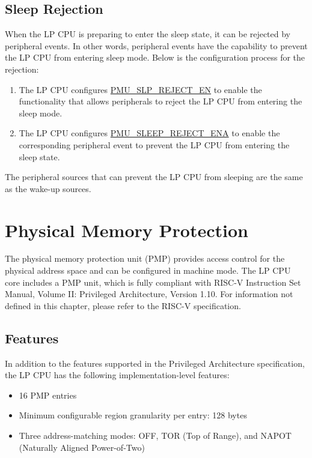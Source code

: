 \documentclass[main\_\_EN.tex]{subfiles}
\begin{document}
\subsection{Sleep Rejection}

When the LP CPU is preparing to enter the sleep state, it can be rejected by peripheral events. In other words, peripheral events have the capability to prevent the LP CPU from entering sleep mode. Below is the configuration process for the rejection:

\begin{enumerate}
    \item The LP CPU configures \hyperref[fielddesc:PMUSLPREJECTEN]{PMU\_SLP\_REJECT\_EN} to enable the functionality that allows peripherals to reject the LP CPU from entering the sleep mode.
    \item The LP CPU configures \hyperref[fielddesc:PMUSLEEPREJECTENA]{PMU\_SLEEP\_REJECT\_ENA} to enable the corresponding peripheral event to prevent the LP CPU from entering the sleep state.
\end{enumerate}

The peripheral sources that can prevent the LP CPU from sleeping are the same as the wake-up sources.

\section{Physical Memory Protection}\label{sec:pmp}

The physical memory protection unit (PMP) provides access control for the physical address space and can be configured in machine mode. The LP CPU core includes a PMP unit, which is fully compliant with RISC-V Instruction Set Manual, Volume II: Privileged Architecture, Version 1.10. For information not defined in this chapter, please refer to the RISC-V specification.

\subsection{Features}

In addition to the features supported in the Privileged Architecture specification, the LP CPU has the following implementation-level features:

\begin{itemize}
    \item 16 PMP entries
    \item Minimum configurable region granularity per entry: 128 bytes
    \item Three address-matching modes: OFF, TOR (Top of Range), and NAPOT (Naturally Aligned Power-of-Two)
\end{itemize}
\end{document}

